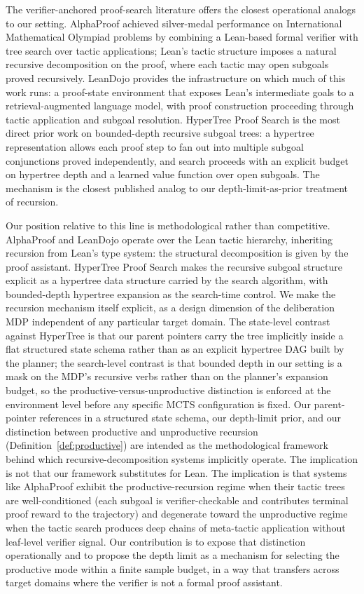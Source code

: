 The verifier-anchored proof-search literature offers the closest
operational analogs to our setting. AlphaProof
\citep{deepmind2024alphaproof} achieved silver-medal performance on
International Mathematical Olympiad problems by combining a Lean-based
formal verifier with tree search over tactic applications; Lean's
tactic structure imposes a natural recursive decomposition on the
proof, where each tactic may open subgoals proved recursively. LeanDojo
\citep{yang2023leandojo} provides the infrastructure on which much of
this work runs: a proof-state environment that exposes Lean's
intermediate goals to a retrieval-augmented language model, with proof
construction proceeding through tactic application and subgoal
resolution. HyperTree Proof Search
\citep{lample2022hypertree} is the most direct prior work on
bounded-depth recursive subgoal trees: a hypertree representation
allows each proof step to fan out into multiple subgoal conjunctions
proved independently, and search proceeds with an explicit budget on
hypertree depth and a learned value function over open subgoals. The
mechanism is the closest published analog to our depth-limit-as-prior
treatment of recursion.

Our position relative to this line is methodological rather than
competitive. AlphaProof and LeanDojo operate over the Lean tactic
hierarchy, inheriting recursion from Lean's type system: the structural
decomposition is given by the proof assistant. HyperTree Proof Search
makes the recursive subgoal structure explicit as a hypertree data
structure carried by the search algorithm, with bounded-depth
hypertree expansion as the search-time control. We make the recursion
mechanism itself explicit, as a design dimension of the deliberation
MDP independent of any particular target domain. The state-level
contrast against HyperTree is that our parent pointers carry the tree
implicitly inside a flat structured state schema rather than as an
explicit hypertree DAG built by the planner; the search-level
contrast is that bounded depth in our setting is a mask on the
MDP's recursive verbs rather than on the planner's expansion budget,
so the productive-versus-unproductive distinction is enforced at the
environment level before any specific MCTS configuration is fixed. Our parent-pointer
references in a structured state schema, our depth-limit prior, and our
distinction between productive and unproductive recursion
(Definition~\ref{def:productive}) are intended as the methodological
framework behind which recursive-decomposition systems implicitly
operate. The implication is not that our framework substitutes for
Lean. The implication is that systems like AlphaProof exhibit the
productive-recursion regime when their tactic trees are well-conditioned
(each subgoal is verifier-checkable and contributes terminal proof
reward to the trajectory) and degenerate toward the unproductive regime
when the tactic search produces deep chains of meta-tactic application
without leaf-level verifier signal. Our contribution is to expose that
distinction operationally and to propose the depth limit as a mechanism
for selecting the productive mode within a finite sample budget, in a
way that transfers across target domains where the verifier is not a
formal proof assistant.

